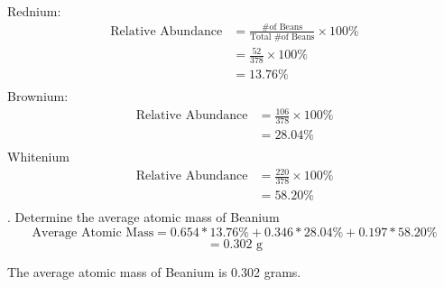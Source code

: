 \documentclass[10pt]{extarticle}
\begin{document}
    \noindent Rednium:
    \begin{align*}
        \text{Relative Abundance}&=\frac{\text{\# of Beans}}{\text{Total \# of Beans}}\times100\%\\    
        &=\frac{52}{378}\times100\%\\
        &=13.76\%\\
    \end{align*}
    \newpage
    \noindent Brownium:
    \begin{align*}
        \text{Relative Abundance}&=\frac{106}{378}\times100\%\\
        &=28.04\%\\
    \end{align*}
    \noindent Whitenium
    \begin{align*}
        \text{Relative Abundance}&=\frac{220}{378}\times100\%\\
        &=58.20\%\\
    \end{align*}
    . Determine the average atomic mass of Beanium
    \medskip
    $$\text{Average Atomic Mass}=0.654*13.76\%+0.346*28.04\%+0.197*58.20\%$$
    $$=0.302\text{ g}$$

    \noindent The average atomic mass of Beanium is 0.302 grams.
\end{document}
